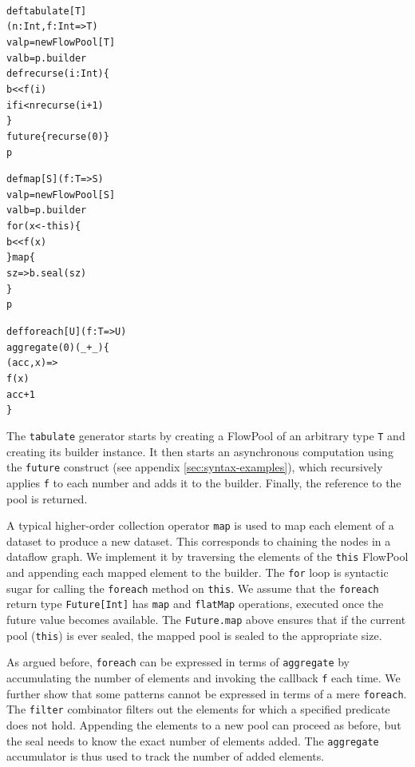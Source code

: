 \documentclass[runningheads,a4paper]{llncs}
\begin{document}
\noindent
\begin{minipage}[b]{4.2 cm}
\begin{alltt}
{\scriptsize
def tabulate[T]
  (n: Int, f: Int => T)
  val p = new FlowPool[T]
  val b = p.builder
  def recurse(i: Int) \{
    b << f(i)
    if i < n recurse(i + 1)
  \}
  future \{ recurse(0) \}
  p
}
\end{alltt}
\end{minipage}\begin{minipage}[b]{4 cm}
\begin{alltt}
{\scriptsize
def map[S](f: T => S)
  val p = new FlowPool[S]
  val b = p.builder
  for (x <- this) \{
    b << f(x)
  \} map \{
    sz => b.seal(sz)
  \}
  p

}
\end{alltt}
\end{minipage}
\begin{minipage}[b]{2.5 cm}
\begin{alltt}
{\scriptsize
def foreach[U](f: T => U)
  aggregate(0)(_ + _) \{
    (acc, x) =>
    f(x)
    acc + 1
  \}




}
\end{alltt}
\end{minipage}

The \verb=tabulate= generator starts by creating a FlowPool of an
arbitrary type \verb=T= and creating its builder instance.
It then starts an asynchronous computation using the \verb=future=
construct (see appendix \ref{sec:syntax-examples}), which recursively applies \verb=f= to each number and
adds it to the builder.
Finally, the reference to the pool is returned.

A typical higher-order collection operator \verb=map= is used to
map each element of a dataset to produce a new dataset.
This corresponds to chaining the nodes in a dataflow graph.
We implement it by traversing the elements of the \verb=this= FlowPool
and
appending each mapped element to the builder.
The \verb=for= loop is syntactic sugar for calling the
\verb=foreach= method on \verb=this=.
We assume that the \verb=foreach= return type \verb=Future[Int]=
has \verb=map= and \verb=flatMap= operations, executed
once the future value becomes available.
The \verb=Future.map= above ensures that if the current pool (\verb=this=) is ever
sealed, the mapped pool is sealed to the appropriate size.

As argued before, \verb=foreach= can be expressed in terms of
\verb=aggregate= by accumulating the number of elements and invoking the
callback \verb=f= each time.
We further show that some patterns cannot be expressed in terms of a mere
\verb=foreach=.
The \verb=filter= combinator filters out the elements for which a
specified predicate does not hold.
Appending the elements to a new pool can proceed as
before, but the seal needs to know the exact number of elements added.
The \verb=aggregate= accumulator is thus used to track the number
of added elements.
\end{document}
